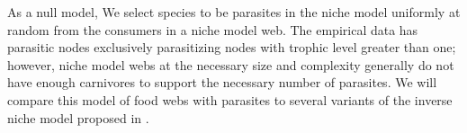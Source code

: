 \documentclass[/home/nkappler/Research/Dissertation/
 dissertation.tex]{subfiles}
\begin{document}
\begin{bibunit}
As a null model, We select species to be parasites in the niche model uniformly
at random from the consumers in a niche model web. The empirical data has
parasitic nodes exclusively parasitizing nodes with trophic level greater than
one; however, niche model webs at the necessary size and complexity generally
do not have enough carnivores to support the necessary number of parasites. We
will compare this model of food webs with parasites to several variants of the
inverse niche model proposed in \cite*{Warren2010}.





\end{bibunit}
\end{document}

